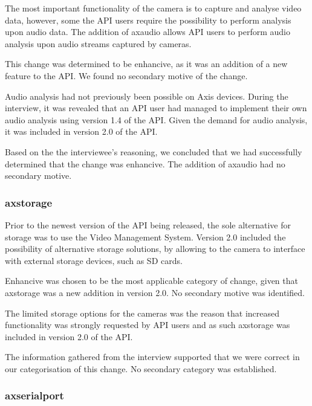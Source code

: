 \documentclass{sig-alternate}
\begin{document}
The most important functionality of the camera is to capture and analyse video data, however, some the API users require the possibility to perform analysis upon audio data. The addition of axaudio allows API users to perform audio analysis upon audio streams captured by cameras. 

This change was determined to be enhancive, as it was an addition of a new feature to the API. We found no secondary motive of the change. 


Audio analysis had not previously been possible on Axis devices. During the interview, it was revealed that an API user had managed to implement their own audio analysis using version 1.4 of the API. Given the demand for audio analysis, it was included in version 2.0 of the API.

Based on the the interviewee's reasoning, we concluded that we had successfully determined that the change was enhancive. The addition of axaudio had no secondary motive. 

\subsubsection{axstorage}

Prior to the newest version of the API being released, the sole alternative for storage was to use the Video Management System. Version 2.0 included the possibility of alternative storage solutions, by allowing to the camera to interface with external storage devices, such as SD cards. 

Enhancive was chosen to be the most applicable category of change, given that axstorage was a new addition in version 2.0. No secondary motive was identified. 

The limited storage options for the cameras was the reason that increased functionality was strongly requested by API users and as such axstorage was included in version 2.0 of the API.

The information gathered from the interview supported that we were correct in our categorisation of this change. No secondary category was established. 

\subsubsection{axserialport}
\end{document}
